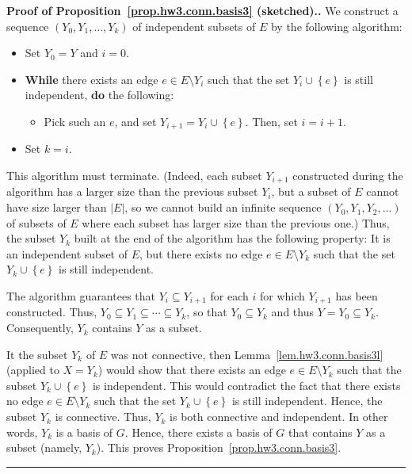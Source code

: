 \documentclass[numbers=enddot,12pt,final,onecolumn,notitlepage]{scrartcl}%
\theoremstyle{definition}
\newenvironment{proof}[1][Proof]{\noindent\textbf{#1.} }{\ \rule{0.5em}{0.5em}}
\newcommand{\set}[1]{\left\{ #1 \right\}}
\newcommand{\abs}[1]{\left| #1 \right|}
\newcommand{\tup}[1]{\left( #1 \right)}
\begin{document}
\begin{proof}[Proof of Proposition~\ref{prop.hw3.conn.basis3}
(sketched).]
We construct a sequence $\tup{Y_0, Y_1, \ldots, Y_k}$ of
independent subsets of $E$ by the following algorithm:

\begin{itemize}
 \item Set $Y_0 = Y$ and $i = 0$.
 \item \textbf{While} there exists an edge $e \in E \setminus Y_i$
       such that the set $Y_i \cup \set{e}$ is still independent,
       \textbf{do} the following:
       \begin{itemize}
       \item Pick such an $e$, and set $Y_{i+1} = Y_i \cup \set{e}$.
             Then, set $i = i+1$.
       \end{itemize}
 \item Set $k = i$.
\end{itemize}

This algorithm must terminate.
(Indeed, each subset $Y_{i+1}$ constructed during the algorithm
has a larger size than the previous subset $Y_i$, but a subset
of $E$ cannot have size larger than $\abs{E}$, so we cannot build an
infinite sequence $\tup{Y_0, Y_1, Y_2, \ldots}$ of subsets of
$E$ where each subset has larger size than the previous one.)
Thus, the subset $Y_k$ built at the end of the algorithm has
the following property: It is an independent subset of $E$,
but there exists no edge $e \in E \setminus Y_k$ such that the
set $Y_k \cup \set{e}$ is still independent.

The algorithm guarantees that $Y_i \subseteq Y_{i+1}$ for each
$i$ for which $Y_{i+1}$ has been constructed.
Thus, $Y_0 \subseteq Y_1 \subseteq \cdots \subseteq Y_k$,
so that $Y_0 \subseteq Y_k$ and thus
$Y = Y_0 \subseteq Y_k$.
Consequently, $Y_k$ contains $Y$ as a subset.

It the subset $Y_k$ of $E$ was not connective, then
Lemma~\ref{lem.hw3.conn.basis3l} (applied to $X = Y_k$) would
show that there exists an edge $e \in E \setminus Y_k$
such that the subset $Y_k \cup \set{e}$ is independent.
This would contradict the fact that there exists no edge
$e \in E \setminus Y_k$ such that the
set $Y_k \cup \set{e}$ is still independent.
Hence, the subset $Y_k$ is connective.
Thus, $Y_k$ is both connective and independent.
In other words, $Y_k$ is a basis of $G$.
Hence, there exists a basis of $G$ that contains $Y$ as a subset
(namely, $Y_k$).
This proves Proposition~\ref{prop.hw3.conn.basis3}.
\end{proof}
\end{document}

